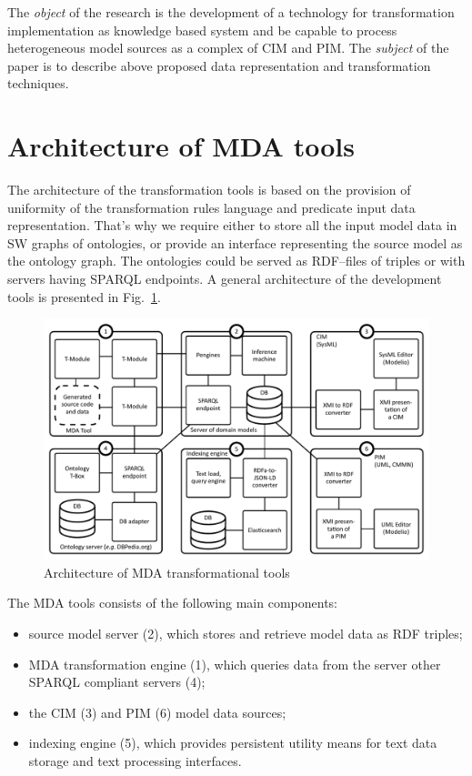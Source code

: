 \documentclass[conference]{IEEEtran}
\begin{document}
The \emph{object} of the research is the development of a technology for transformation implementation as knowledge based system and be capable to process heterogeneous model sources as a complex of CIM and PIM. The \emph{subject} of the paper is to describe above proposed data representation and transformation techniques.

\section{Architecture of MDA tools}


The architecture of the transformation tools is based on the provision of uniformity of the transformation rules language and predicate input data representation.  That's why we require either to store all the input model data in SW graphs of ontologies, or provide an interface representing the source model as the ontology graph.  The ontologies could be served as RDF--files of triples or with servers having SPARQL endpoints.  A general architecture of the development tools is presented in Fig.~\ref{fig:archi}.

\begin{figure}[htb]
  \centering
   \includegraphics[width=1\linewidth]{pics/architecture-mda-lod-ext.pdf}
  \caption{Architecture of MDA transformational tools}
  \label{fig:archi}
\end{figure}

The MDA tools consists of the following main components:
\begin{itemize}
\item source model server (2), which stores and retrieve model data as RDF triples;
\item MDA transformation engine (1), which queries data from the server other SPARQL compliant  servers (4);
\item the CIM (3) and PIM (6) model data sources;
\item indexing engine (5), which provides persistent utility means for text data storage and text processing interfaces.
\end{itemize}
\end{document}
